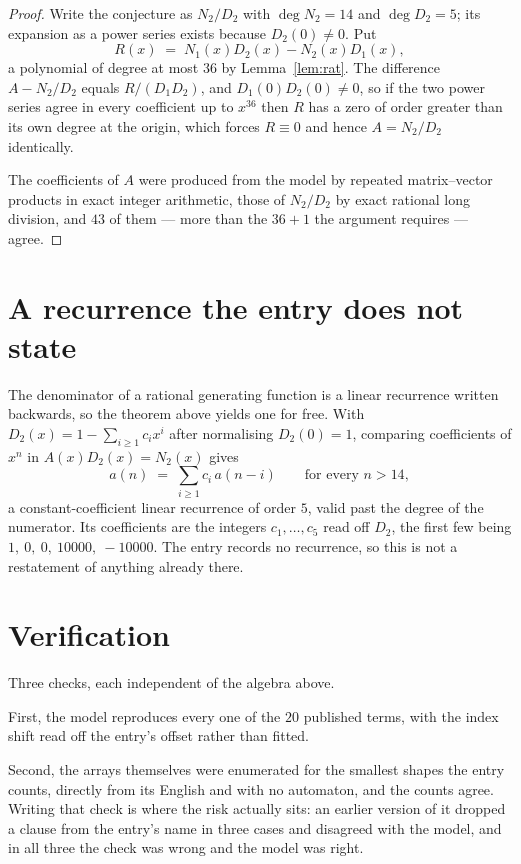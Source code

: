 \documentclass[11pt,a4paper]{article}
\theoremstyle{plain}
\theoremstyle{definition}
\begin{document}
\begin{proof}
Write the conjecture as $N_2/D_2$ with $\deg N_2=14$ and $\deg D_2=5$; its expansion as a
power series exists because $D_2(0)\neq0$. Put
\[
R(x)\;=\;N_1(x)D_2(x)-N_2(x)D_1(x),
\]
a polynomial of degree at most $36$ by Lemma~\ref{lem:rat}. The difference
$A-N_2/D_2$ equals $R/(D_1D_2)$, and $D_1(0)D_2(0)\neq0$, so if the two power series agree in
every coefficient up to $x^{36}$ then $R$ has a zero of order greater than its own
degree at the origin, which forces $R\equiv0$ and hence $A=N_2/D_2$ identically.

The coefficients of $A$ were produced from the model by repeated matrix--vector products in
exact integer arithmetic, those of $N_2/D_2$ by exact rational long division, and $43$
of them --- more than the $36+1$ the argument requires --- agree.
\end{proof}

\section{A recurrence the entry does not state}

The denominator of a rational generating function is a linear recurrence written backwards, so
the theorem above yields one for free. With $D_2(x)=1-\sum_{i\ge1}c_ix^i$ after normalising
$D_2(0)=1$, comparing coefficients of $x^n$ in $A(x)D_2(x)=N_2(x)$ gives
\[
a(n)\;=\;\sum_{i\ge1}c_i\,a(n-i)\qquad\text{for every }n>14,
\]
a constant-coefficient linear recurrence of order $5$, valid past the degree of the
numerator. Its coefficients are the integers $c_1,\dots,c_{5}$ read off $D_2$, the first few being $1,\ 0,\ 0,\ 10000,\ -10000$. The entry records no recurrence, so this is not a restatement of anything
already there.

\section{Verification}

Three checks, each independent of the algebra above.

First, the model reproduces every one of the $20$ published terms, with the index shift
read off the entry's offset rather than fitted.

Second, the arrays themselves were enumerated for the smallest shapes the entry counts,
directly from its English and with no automaton, and the counts agree. Writing that check is
where the risk actually sits: an earlier version of it dropped a clause from the entry's name
in three cases and disagreed with the model, and in all three the check was wrong and the model
was right.
\end{document}
